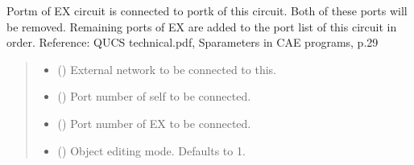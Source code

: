\documentclass[letterpaper,10pt,english]{sphinxmanual}
\begin{document}
\begin{fulllineitems}
\begin{fulllineitems}
\begin{quote}
\begin{description}
\end{description}\end{quote}

\end{fulllineitems}


\begin{fulllineitems}
\label{\detokenize{touchstone:touchstone.spfile.connect_network_1_conn}}
\pysigstartsignatures
{}
\pysigstopsignatures
\sphinxAtStartPar
Port\sphinxhyphen{}m of EX circuit is connected to port\sphinxhyphen{}k of this circuit. Both of these ports will be removed.
Remaining ports of EX are added to the port list of this circuit in order.
Reference: QUCS technical.pdf, S\sphinxhyphen{}parameters in CAE programs, p.29
\begin{quote}\begin{description}
\begin{itemize}
\item {} 
\sphinxAtStartPar
{} ({\hyperref[\detokenize{touchstone:touchstone.spfile}]{}}) \textendash{} External network to be connected to this.

\item {} 
\sphinxAtStartPar
{} () \textendash{} Port number of self to be connected.

\item {} 
\sphinxAtStartPar
{} () \textendash{} Port number of EX to be connected.

\item {} 
\sphinxAtStartPar
{} (\sphinxstyleliteralemphasis{\sphinxupquote{, }}) \textendash{} Object editing mode. Defaults to \sphinxhyphen{}1.


\end{itemize}
\end{description}
\end{quote}
\end{fulllineitems}
\end{fulllineitems}
\end{document}
